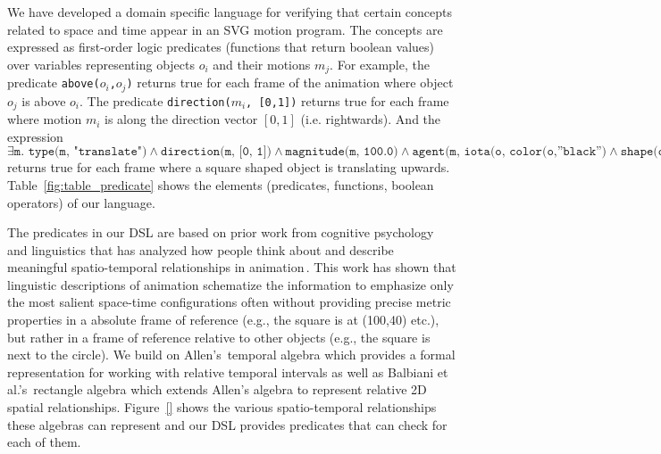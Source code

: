 We have developed a domain specific language for verifying that
certain concepts related to space and time appear in an SVG motion
program.
The concepts are expressed as first-order logic predicates (functions
that return boolean values)
over variables representing objects $o_i$ and their
motions $m_j$.
%
For example, the predicate {\tt above($o_i$,$o_j$)} returns true for
each frame of the animation where object $o_j$ is above
$o_i$. 
%
The predicate {\tt direction($m_i$, [0,1])} returns true for each frame where
motion $m_i$ is along the direction vector $[0,1]$ (i.e. rightwards).
%
And the expression $ \exists \texttt{m. type(m, "translate")} \land
\texttt{direction(m, [0, 1])} \land \texttt{magnitude(m, 100.0)} \land
\texttt{agent(m, iota(o, color(o,''black'')} \land
\texttt{shape(o,''square''))}$ returns true for each frame where a
square shaped object is translating upwards.  
%
Table~\ref{fig:table_predicate} shows the elements (predicates,
functions, boolean operators) of our language.


The predicates in our DSL are based on prior work from cognitive
psychology and linguistics that has analyzed how people think about
and describe meaningful spatio-temporal relationships in
animation\,\cite{Talmy,Tversky}. 
%
This work has shown that linguistic descriptions of animation
schematize the information to emphasize only the most salient
space-time configurations often without providing precise metric
properties in a absolute frame of reference (e.g., the square is at
(100,40) etc.), but rather in a frame of reference relative to other
objects (e.g., the square is next to the circle).
%
We build on Allen's\,\shortcite{} temporal algebra which provides a
formal representation for working with relative temporal
intervals as well as Balbiani et al.'s\,\shortcite{} rectangle algebra which
extends Allen's algebra to represent relative 2D spatial relationships.
%
Figure~\ref{} shows the various spatio-temporal relationships these
algebras can represent and our DSL provides predicates that can check
for each of them.


